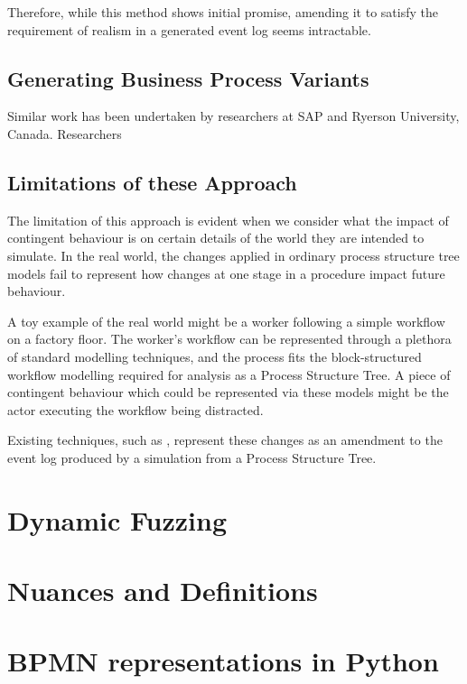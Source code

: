\documentclass[12pt,draft]{article}
\begin{document}
Therefore, while this method shows initial promise, amending it to satisfy the
requirement of realism in a generated event log seems intractable.
\par

\subsection{Generating Business Process Variants}  %
Similar work has been undertaken by researchers at SAP and Ryerson University,
Canada. Researchers 

\subsection{Limitations of these Approach}
The limitation of this approach is evident when we consider what the impact of
contingent behaviour is on certain details of the world they are intended to
simulate. In the real world, the changes applied in ordinary process structure
tree models fail to represent how changes at one stage in a procedure impact
future behaviour.\par

A toy example of the real world might be a worker following a simple workflow on
a factory floor. The worker's workflow can be represented through a plethora of
standard modelling techniques, and the process fits the block-structured
workflow modelling required for analysis as a Process Structure Tree. A piece of
contingent behaviour which could be represented via these models might be the
actor executing the workflow being distracted.\par

Existing techniques, such as , represent these changes as an
amendment to the event log produced by a simulation from a Process Structure
Tree. \par




\section{Dynamic Fuzzing}


\section{Nuances and Definitions}



\section{BPMN representations in Python}
\end{document}
